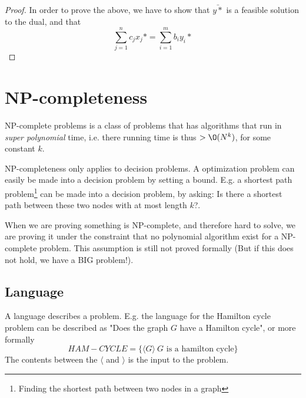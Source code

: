 \documentclass[10pt]{article}
\begin{document}
\begin{proof}
In order to prove the above, we have to show that $\bar{y*}$ is a feasible solution to the dual, and that 
\begin{equation}
  \sum_{j=1}^n c_jx_j* = \sum_{i=1}^m b_iy_i*  
\end{equation}
\end{proof}
 


\clearpage \newpage

\section{NP-completeness} %
\label{sec:np_completeness}

NP-complete problems is a class of problems that has algorithms that run in \emph{super polynomial} time, i.e. there running time is thus $>\O(N^k)$, for some constant $k$.

NP-completeness only applies to decision problems. A optimization problem can easily be made into a decision problem by setting a bound. E.g. a shortest path problem\footnote{Finding the shortest path between two nodes in a graph} can be made into a decision problem, by asking: Is there a shortest path between these two nodes with at most length $k$?.  

When we are proving something is NP-complete, and therefore hard to solve, we are proving it under the constraint that no polynomial algorithm exist for a NP-complete problem. This assumption is still not proved formally (But if this does not hold, we have a BIG problem!).


\subsection{Language} %
\label{sub:language}
A language describes a problem. E.g. the language for the Hamilton cycle problem can be described as "Does the graph $G$ have a Hamilton cycle", or more formally
\begin{equation}
HAM-CYCLE = \{\langle G \rangle\: G \text{ is a hamilton cycle}\}   
\end{equation}
The contents between the $\langle$ and $\rangle$ is the input to the problem.
\end{document}
